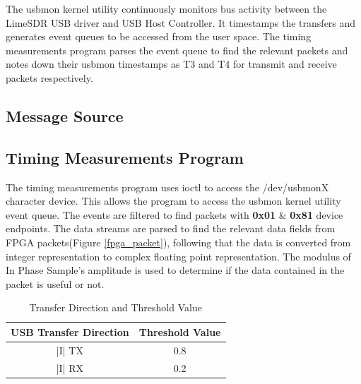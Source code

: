 The usbmon kernel utility continuously monitors bus activity between the LimeSDR USB driver and USB Host Controller. It timestamps the transfers and generates event queues to be accessed from the user space. The timing measurements program parses the event queue to find the relevant packets and notes down their usbmon timestamps as T3 and T4 for transmit and receive packets respectively.  
\subsection{Message Source} \label{message_source}

\subsection{Timing Measurements Program}
The timing measurements program uses ioctl to access the /dev/usbmonX character device. This allows the program to access the usbmon kernel utility event queue. The events are filtered to find packets with \textbf{0x01} \& \textbf{0x81} device endpoints. The data streams are parsed to find the relevant data fields from FPGA packets(Figure \ref{fpga_packet}), following that the data is converted from integer representation to complex floating point representation. The modulus of In Phase Sample's amplitude is used to determine if the data contained in the packet is useful or not. 

\begin{table}
\centering
\begin{tabular}{|c|c|}
\hline
USB Transfer Direction & Threshold Value  \\
\hline
|I| TX & 0.8\\
|I| RX & 0.2\\
\hline
\end{tabular}
\caption{Transfer Direction and Threshold Value}
\label{thres_table}
\end{table}


